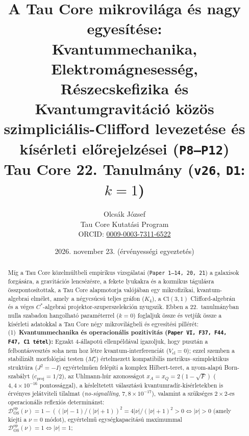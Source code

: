 \documentclass[11pt,a4paper]{article}
\title{\textbf{A Tau Core mikrovilága és nagy egyesítése:\\
Kvantummechanika, Elektromágnesesség, Részecskefizika és Kvantumgravitáció közös szimpliciális-Clifford levezetése és kísérleti előrejelzései (\texttt{P8--P12})}\\
\large Tau Core 22. Tanulmány (\texttt{v26}, \texttt{D1}: $k=1$)}
\author{Olcsák József\\
\small Tau Core Kutatási Program\\{\small ORCID: \href{https://orcid.org/0009-0003-7311-6522}{0009-0003-7311-6522}}}
\date{2026. november 23. (érvényességi egyeztetés)}
\begin{document}
\maketitle

\begin{abstract}
Míg a Tau Core közelmúltbeli empirikus vizsgálatai (\texttt{Paper 1--14, 20, 21}) a galaxisok forgására, a gravitációs lencsézésre, a fekete lyukakra és a kozmikus tágulásra összpontosítottak, a Tau Core alapmotorja valójában egy mikrofizikai, kvantum-algebrai elmélet, amely a négycsúcsú teljes gráfon ($K_4$), a $\mathrm{Cl}(3,1)$ Clifford-algebrán és a véges $C^*$-algebrai projektor-szuperszelekción nyugszik. Ebben a 22.\ tanulmányban nulla szabadon hangolható paraméterrel ($k=0$) foglaljuk össze és vetjük össze a kísérleti adatokkal a Tau Core négy mikrovilágbeli és egyesítési pillérét:
(1)~\textbf{Kvantummechanika és operacionális pozitivitás (\texttt{Paper VI, F37, F44, F47, C1 tétel}):} Egzakt 4-állapotú ellenpéldával igazoljuk, hogy pusztán a felbontásvesztés soha nem hoz létre kvantum-interferenciát ($V_{\mathrm{cl}}=0$); ezzel szemben a stabilizált morfológiai testen ($M_\tau^\star$) értelmezett kompatibilis metrikus--szimplektikus struktúra ($J^2=-I$) egyértelműen felépíti a komplex Hilbert-teret, a nyom-alapú Born-szabályt ($c_{\mathrm{proj}}=1/2$), az Uhlmann-húr azonosságot $x_A=x_Q=2(1-\sqrt{F})$ ($4{,}4\times 10^{-16}$ pontossággal), a késleltetett választású kvantumradír-kísérletekben is érvényes jelátviteli tilalmat (\emph{no-signalling}, $7{,}8\times 10^{-17}$), valamint a szükséges $2\times 2$-es operacionális reflexiós determinánst: $\mathcal{D}_{\mathrm{OS}}^{\mathrm{op}}(\nu)=1-((|\nu|-1)/(|\nu|+1))^2=4|\nu|/(|\nu|+1)^2>0\iff|\nu|>0$ (amely kiejti a $\nu=0$ módot), egyértelmű egységkapacitású maximummal $\mathcal{D}_{\mathrm{OS}}^{\mathrm{op}}(\nu)=1\iff|\nu|=1$;

\end{abstract}
\end{document}
